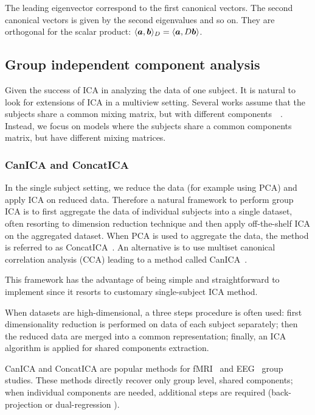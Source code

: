     The leading eigenvector correspond to the first canonical vectors. The
    second canonical vectors is given by the second eigenvalues and so on. They
    are orthogonal for the scalar product: $\langle \boldsymbol{a}, \boldsymbol{b}  \rangle_D =
    \langle \boldsymbol{a}, D \boldsymbol{b}  \rangle$.

  
\subsection{Group independent component analysis}
\label{sec:groupica}
Given the success of ICA in analyzing the data of one subject. It is natural to
look for extensions of ICA in a multiview setting.
Several works assume that the subjects share a common mixing matrix, but with different components~\cite{pfister2019robustifying}~\cite{svensen2002ica}.
% 
Instead, we focus on models where the subjects share a common components matrix, but have different mixing matrices.

\subsubsection{CanICA and ConcatICA}
\label{sec:canicaandconcatica}
In the single subject setting, we reduce the data (for example using PCA) and apply ICA on
reduced data. Therefore a natural framework to perform group ICA is to first aggregate the
data of individual subjects into a single dataset, often resorting to dimension
reduction technique and then apply off-the-shelf ICA on the aggregated dataset.
When PCA is used to aggregate the data, the method is referred to as
ConcatICA~\cite{calhoun2001method}. An alternative is to use multiset canonical
correlation analysis (CCA) leading to a method called CanICA~\cite{varoquaux2009canica}.

This framework has the advantage of being simple and
straightforward to implement since it resorts to customary single-subject
ICA method.

When datasets are high-dimensional, a three steps procedure is often used: first
dimensionality reduction is performed on data of each subject  separately; then
the reduced data are merged into a common representation; finally, an ICA
algorithm is applied for shared components extraction.

CanICA and ConcatICA are popular methods for fMRI~\cite{calhoun2009review} and EEG~\cite{eichele2011eegift} group studies. These methods directly recover only group level, shared components; when individual components are needed, additional steps are required (back-projection \cite{calhoun2001method} or dual-regression \cite{beckmann2009group}).
% 

